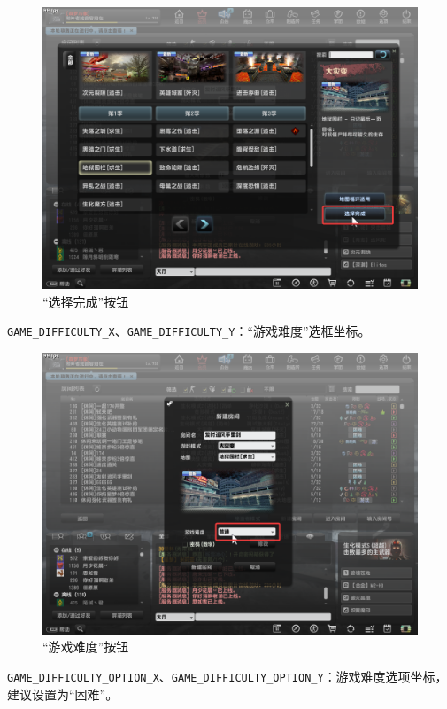 \begin{figure}[H]
    \Centering
    \includegraphics[width=\textwidth]{docs/assets/finish_choose.png}
    \caption{“选择完成”按钮}
\end{figure}

\lstinline{GAME_DIFFICULTY_X}、\lstinline{GAME_DIFFICULTY_Y}：“游戏难度”选框坐标。

\begin{figure}[H]
    \Centering
    \includegraphics[width=\textwidth]{docs/assets/choose_difficulty.png}
    \caption{“游戏难度”按钮}
\end{figure}

\lstinline{GAME_DIFFICULTY_OPTION_X}、\lstinline{GAME_DIFFICULTY_OPTION_Y}：游戏难度选项坐标，建议设置为“困难”。

